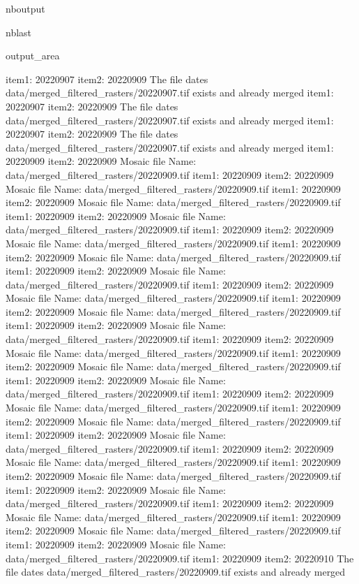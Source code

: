 \documentclass[letterpaper,10pt]{sphinxmanual}
\begin{document}
\begin{sphinxuseclass}{nboutput}
\begin{sphinxuseclass}{nblast}
{\begin{sphinxuseclass}{output_area}
\begin{sphinxuseclass}{}
\begin{sphinxVerbatim}[commandchars=\\\{\}]
item1:  20220907
item2:  20220909
The file dates data/merged\_filtered\_rasters/20220907.tif exists and already merged
item1:  20220907
item2:  20220909
The file dates data/merged\_filtered\_rasters/20220907.tif exists and already merged
item1:  20220907
item2:  20220909
The file dates data/merged\_filtered\_rasters/20220907.tif exists and already merged
item1:  20220909
item2:  20220909
Mosaic file Name:  data/merged\_filtered\_rasters/20220909.tif
item1:  20220909
item2:  20220909
Mosaic file Name:  data/merged\_filtered\_rasters/20220909.tif
item1:  20220909
item2:  20220909
Mosaic file Name:  data/merged\_filtered\_rasters/20220909.tif
item1:  20220909
item2:  20220909
Mosaic file Name:  data/merged\_filtered\_rasters/20220909.tif
item1:  20220909
item2:  20220909
Mosaic file Name:  data/merged\_filtered\_rasters/20220909.tif
item1:  20220909
item2:  20220909
Mosaic file Name:  data/merged\_filtered\_rasters/20220909.tif
item1:  20220909
item2:  20220909
Mosaic file Name:  data/merged\_filtered\_rasters/20220909.tif
item1:  20220909
item2:  20220909
Mosaic file Name:  data/merged\_filtered\_rasters/20220909.tif
item1:  20220909
item2:  20220909
Mosaic file Name:  data/merged\_filtered\_rasters/20220909.tif
item1:  20220909
item2:  20220909
Mosaic file Name:  data/merged\_filtered\_rasters/20220909.tif
item1:  20220909
item2:  20220909
Mosaic file Name:  data/merged\_filtered\_rasters/20220909.tif
item1:  20220909
item2:  20220909
Mosaic file Name:  data/merged\_filtered\_rasters/20220909.tif
item1:  20220909
item2:  20220909
Mosaic file Name:  data/merged\_filtered\_rasters/20220909.tif
item1:  20220909
item2:  20220909
Mosaic file Name:  data/merged\_filtered\_rasters/20220909.tif
item1:  20220909
item2:  20220909
Mosaic file Name:  data/merged\_filtered\_rasters/20220909.tif
item1:  20220909
item2:  20220909
Mosaic file Name:  data/merged\_filtered\_rasters/20220909.tif
item1:  20220909
item2:  20220909
Mosaic file Name:  data/merged\_filtered\_rasters/20220909.tif
item1:  20220909
item2:  20220909
Mosaic file Name:  data/merged\_filtered\_rasters/20220909.tif
item1:  20220909
item2:  20220909
Mosaic file Name:  data/merged\_filtered\_rasters/20220909.tif
item1:  20220909
item2:  20220909
Mosaic file Name:  data/merged\_filtered\_rasters/20220909.tif
item1:  20220909
item2:  20220909
Mosaic file Name:  data/merged\_filtered\_rasters/20220909.tif
item1:  20220909
item2:  20220909
Mosaic file Name:  data/merged\_filtered\_rasters/20220909.tif
item1:  20220909
item2:  20220910
The file dates data/merged\_filtered\_rasters/20220909.tif exists and already merged

\end{sphinxVerbatim}
\end{sphinxuseclass}
\end{sphinxuseclass}}
\end{sphinxuseclass}
\end{sphinxuseclass}
\end{document}
